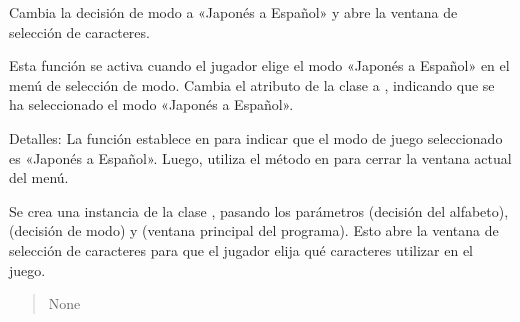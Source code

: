 \documentclass[letterpaper,10pt,spanish]{sphinxmanual}
\begin{document}
\begin{fulllineitems}
\begin{fulllineitems}
\begin{quote}
\begin{description}
\end{description}\end{quote}

\end{fulllineitems}


\begin{fulllineitems}
\label{\detokenize{menu_juego:menu_juego.MenuJuego.japones_a_espanol}}
\pysigstartsignatures
{}
\pysigstopsignatures
\sphinxAtStartPar
Cambia la decisión de modo a «Japonés a Español» y abre la ventana de selección de caracteres.

\sphinxAtStartPar
Esta función se activa cuando el jugador elige el modo «Japonés a Español» en el menú de selección de modo.
Cambia el atributo  de la clase a , indicando que se ha seleccionado el modo «Japonés a
Español».

\sphinxAtStartPar
Detalles:
La función establece  en  para indicar que el modo de juego seleccionado es
«Japonés a Español». Luego, utiliza el método  en  para cerrar la ventana actual del
menú.

\sphinxAtStartPar
Se crea una instancia de la clase , pasando los parámetros  (decisión del
alfabeto),  (decisión de modo) y  (ventana principal del programa). Esto
abre la ventana de selección de caracteres para que el jugador elija qué caracteres utilizar en el juego.
\begin{quote}\begin{description}
\sphinxAtStartPar
None

\end{description}\end{quote}

\end{fulllineitems}


\end{fulllineitems}

\end{document}
